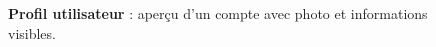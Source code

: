 \documentclass[12pt]{report}
\begin{document}
	\begin{figure}[H]
		\centering
		\begin{minipage}[t]{0.45\textwidth}
			\centering
			\caption*{\textbf{Profil utilisateur} : aperçu d’un compte avec photo et informations visibles.}
		\end{minipage}
	\end{figure}
	
\end{document}

